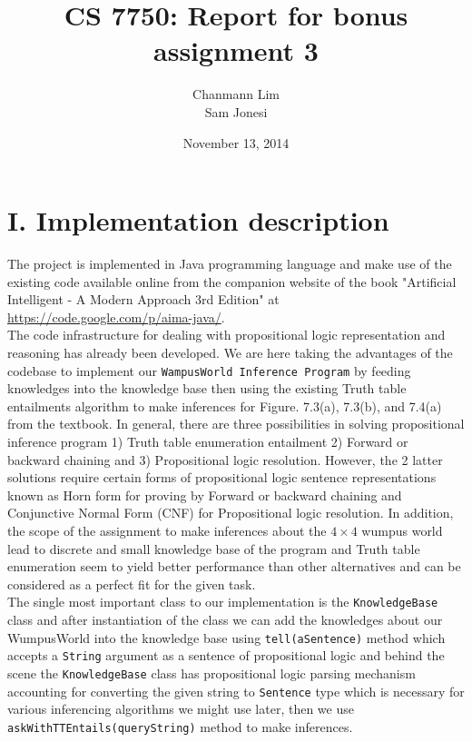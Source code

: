 \documentclass[a4paper]{report}
\begin{document}
\title{CS 7750: Report for bonus assignment 3}
\author{Chanmann Lim \\Sam Jonesi}
\date{November 13, 2014}
\maketitle

\lstset{language=Java,title=\lstname,basicstyle=\footnotesize}

\section*{I. Implementation description}

The project is implemented in Java programming language and make use of the existing code available online from the companion website of the book "Artificial Intelligent - A Modern Approach 3rd Edition" at \url{https://code.google.com/p/aima-java/}. \\

The code infrastructure for dealing with propositional logic representation and reasoning has already been developed. We are here taking the advantages of the codebase to implement our \texttt{WampusWorld Inference Program} by feeding knowledges into the knowledge base then using the existing Truth table entailments algorithm to make inferences for Figure. 7.3(a), 7.3(b), and 7.4(a) from the textbook. In general, there are three possibilities in solving propositional inference program 1) Truth table enumeration entailment 2) Forward or backward chaining and 3) Propositional logic resolution. However, the 2 latter solutions require certain forms of propositional logic sentence representations known as Horn form for proving by Forward or backward chaining and Conjunctive Normal Form (CNF) for Propositional logic resolution. In addition, the scope of the assignment to make inferences about the $4\times4$ wumpus world lead to discrete and small knowledge base of the program and Truth table enumeration seem to yield better performance than other alternatives and can be considered as a perfect fit for the given task. \\

The single most important class to our implementation is the \texttt{KnowledgeBase} class and after instantiation of the class we can add the knowledges about our WumpusWorld into the knowledge base using \texttt{tell(aSentence)} method which accepts a \texttt{String} argument as a sentence of propositional logic and behind the scene the \texttt{KnowledgeBase} class has propositional logic parsing mechanism accounting for converting the given string to \texttt{Sentence} type which is necessary for various inferencing algorithms we might use later, then we use \texttt{askWithTTEntails(queryString)} method to make inferences. \\
\end{document}

